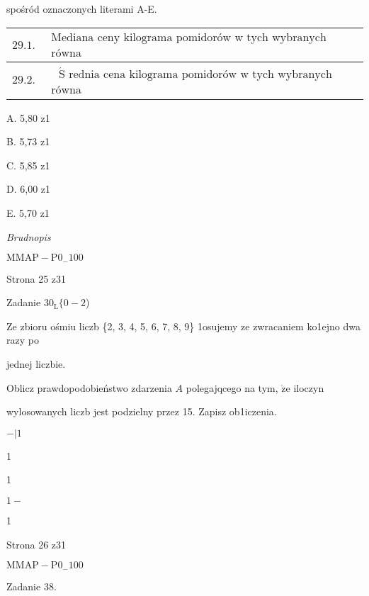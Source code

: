 \documentclass[a4paper,12pt]{article}
\begin{document}
spośród oznaczonych literami A-E.
\begin{center}
\begin{tabular}{|l|l|l|}
\hline
\multicolumn{1}{|l|}{$29.1.$}&	\multicolumn{1}{|l|}{$\begin{array}{l}\mbox{Mediana ceny kilograma pomidorów w tych wybranych sklepach jest}	\\	\mbox{równa}	\end{array}$}&	\multicolumn{1}{|l|}{}	\\
\hline
\multicolumn{1}{|l|}{ $29.2.$}&	\multicolumn{1}{|l|}{$\begin{array}{l}\mbox{ $\acute{\mathrm{S}}$ rednia cena kilograma pomidorów w tych wybranych sklepach jest}	\\	\mbox{równa}	\end{array}$}&	\multicolumn{1}{|l|}{}	\\
\hline
\end{tabular}

\end{center}
A. 5,80 z1

B. 5,73 z1

C. 5,85 z1

D. 6,00 z1

E. 5,70 z1

{\it Brudnopis}

$\mathrm{M}\mathrm{M}\mathrm{A}\mathrm{P}-\mathrm{P}0_{-}100$

Strona 25 z31





Zadanie $30_{\mathrm{L}}\{0-2$)

Ze zbioru ośmiu liczb \{2, 3, 4, 5, 6, 7, 8, 9\} 1osujemy ze zwracaniem ko1ejno dwa razy po

jednej liczbie.

Oblicz prawdopodobieństwo zdarzenia $A$ polegajqcego na tym, $\dot{\mathrm{z}}\mathrm{e}$ iloczyn

wylosowanych liczb jest podzielny przez 15. Zapisz ob1iczenia.

$-|1$

1

1

$1-$

1

Strona 26 z31

$\mathrm{M}\mathrm{M}\mathrm{A}\mathrm{P}-\mathrm{P}0_{-}100$





Zadanie 38.
\end{document}
